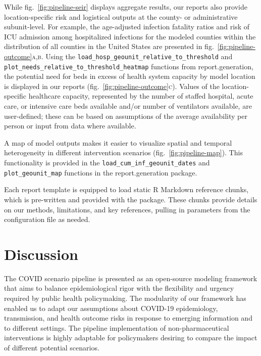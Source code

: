 {While fig.~\ref{fig:pipeline-seir} displays aggregate results, our reports also provide location-specific risk and logistical outputs at the county- or administrative subunit-level. For example, the age-adjusted infection fatality ratios and risk of ICU admission among hospitalized infections for the modeled counties within the distribution of all counties in the United States are presented in fig.~\ref{fig:pipeline-outcome}\textsc{a,b}. Using the \verb|load_hosp_geounit_relative_to_threshold| and \verb|plot_needs_relative_to_threshold_heatmap| functions from report.generation, the potential need for beds in excess of health system capacity by model location is displayed in our reports (fig.~\ref{fig:pipeline-outcome}\textsc{c}). Values of the location-specific healthcare capacity, represented by the number of staffed hospital, acute care, or intensive care beds available and/or number of ventilators available, are user-defined; these can be based on assumptions of the average availability per person or input from data where available.

A map of model outputs makes it easier to visualize spatial and temporal heterogeneity in different intervention scenarios (fig.~\ref{fig:pipeline-map}). This functionality is provided in the \verb|load_cum_inf_geounit_dates| and \verb|plot_geounit_map| functions in the report.generation package.

Each report template is equipped to load static R Markdown reference chunks, which is pre-written and provided with the package. These chunks provide details on our methods, limitations, and key references, pulling in parameters from the configuration file as needed.

\section{Discussion}
The COVID scenario pipeline is presented as an open-source modeling framework that aims to balance epidemiological rigor with the flexibility and urgency required by public health policymaking. The modularity of our framework has enabled us to adapt our assumptions about COVID-19 epidemiology, transmission, and health outcome risks in response to emerging information and to different settings. The pipeline implementation of non-pharmaceutical interventions is highly adaptable for policymakers desiring to compare the impact of different potential scenarios.

}
